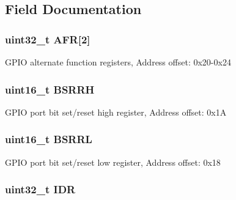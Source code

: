 \subsection{Field Documentation}
\hypertarget{struct_g_p_i_o___type_def_ab67c1158c04450d19ad483dcd2192e43}{
\subsubsection[{A\-F\-R}]{ uint32\-\_\-t A\-F\-R\mbox{[}2\mbox{]}}}\label{struct_g_p_i_o___type_def_ab67c1158c04450d19ad483dcd2192e43}
G\-P\-I\-O alternate function registers, Address offset\-: 0x20-\/0x24 \hypertarget{struct_g_p_i_o___type_def_a35f89f65edca7ed58738166424aeef48}{
\subsubsection[{B\-S\-R\-R\-H}]{ uint16\-\_\-t B\-S\-R\-R\-H}}\label{struct_g_p_i_o___type_def_a35f89f65edca7ed58738166424aeef48}
G\-P\-I\-O port bit set/reset high register, Address offset\-: 0x1\-A \hypertarget{struct_g_p_i_o___type_def_aa79204c9bcc8c481da0a5ffe7c74d8b0}{
\subsubsection[{B\-S\-R\-R\-L}]{ uint16\-\_\-t B\-S\-R\-R\-L}}\label{struct_g_p_i_o___type_def_aa79204c9bcc8c481da0a5ffe7c74d8b0}
G\-P\-I\-O port bit set/reset low register, Address offset\-: 0x18 \hypertarget{struct_g_p_i_o___type_def_a328d2fe9ef1d513c3a97d30f98f0047c}{
\subsubsection[{I\-D\-R}]{ uint32\-\_\-t I\-D\-R}}\label{struct_g_p_i_o___type_def_a328d2fe9ef1d513c3a97d30f98f0047c}
